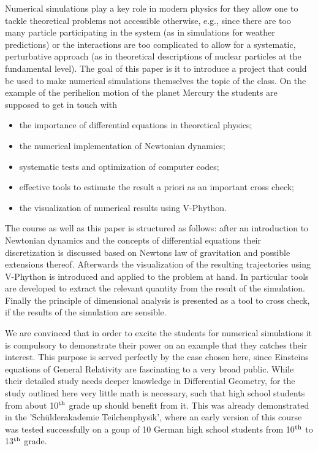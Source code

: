 \documentclass[12pt]{iopart}
\begin{document}
Numerical simulations play a key role in modern physics for they allow one to tackle theoretical problems
not accessible otherwise, e.g., since there are too many particle participating in the system (as in
simulations for weather predictions) or the interactions are too complicated to allow for a systematic,
perturbative approach (as in theoretical descriptions of nuclear particles at the fundamental level). 
 The goal of this paper is it to
introduce a project that could be used to make numerical simulations themselves the topic of the class.
On the example of the perihelion motion of the planet Mercury the students are supposed to get in touch with
\begin{itemize}
\item the importance of differential equations in theoretical physics;
\item the numerical implementation of Newtonian dynamics;
\item systematic tests and optimization of computer codes;
\item effective tools to estimate the result a priori as an important cross check;
\item the visualization of numerical results using V-Phython.
\end{itemize}
The course as well as this paper is structured as follows: after an introduction to Newtonian dynamics and the 
concepts of differential equations their discretization is discussed based on Newtons law of gravitation and possible
extensions thereof. Afterwards the visualization of the resulting trajectories using V-Phython is introduced and
applied to the problem at hand. In particular tools are developed to extract the relevant quantity from the result
of the simulation.
Finally the principle of dimensional analysis is presented as a tool to cross check, if the results of the simulation
are sensible.

We are convinced that in order to excite the students for numerical simulations it is compulsory to
demonstrate their power on an example that they catches their interest. This purpose is served 
perfectly by the case chosen here, since Einsteins equations of General Relativity are fascinating to
a very broad public. While their detailed study needs deeper knowledge in Differential Geometry, for
the study outlined here very little math is necessary, such that high school students from about 
10$^{\rm th}$ grade up should benefit from it. This was already demonstrated in the
'Sch\"ulderakademie Teilchenphysik', where an early version of this course was tested successfully 
on a goup of 10 German high school students from 10$^{\rm th}$ to 13$^{\rm th}$ grade.
\end{document}
